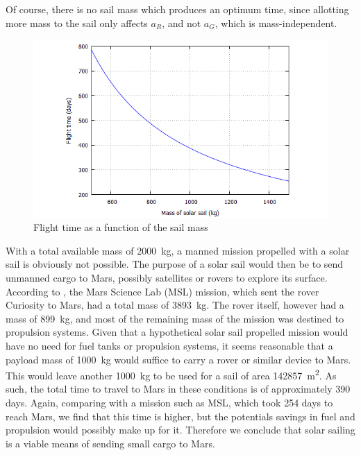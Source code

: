 \documentclass[twocolumn,12pt,a4paper]{article}
\numberwithin{equation}{section}
\begin{document}
Of course, there is no sail mass which produces an optimum time, since allotting more mass to the sail only affects \( a_R \), and not \( a_G \), which is mass-independent. 

\begin{figure}[b]
	\centering
	\includegraphics[scale=0.35]{time}
	\caption{Flight time as a function of the sail mass}
	\label{fig:time of flight}
\end{figure}

With a total available mass of \SI{2000}{kg}, a manned mission propelled with a solar sail is obviously not possible. The purpose of a solar sail would then be to send unmanned cargo to Mars, possibly satellites or rovers to explore its surface. According to \cite{presskit}, the Mars Science Lab (MSL) mission, which sent the rover Curiosity to Mars, had a total mass of \SI{3893}{kg}. The rover itself, however had a mass of \SI{899}{kg}, and most of the remaining mass of the mission was destined to propulsion systems. Given that a hypothetical solar sail propelled mission would have no need for fuel tanks or propulsion systems, it seems reasonable that a payload mass of \SI{1000}{kg} would suffice to carry a rover or similar device to Mars. This would leave another \SI{1000}{kg} to be used for a sail of area \SI{142857}{m^2}. As such, the total time to travel to Mars in these conditions is of approximately 390 days. Again, comparing with a mission such as MSL, which took 254 days to reach Mars, we find that this time is higher, but the potentials savings in fuel and propulsion would possibly make up for it. Therefore we conclude that solar sailing is a viable means of sending small cargo to Mars. 
\end{document}
